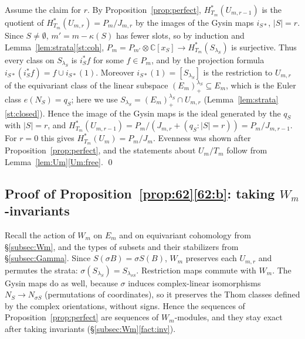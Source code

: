 \documentclass[11pt]{amsart}
\theoremstyle{definition}
\theoremstyle{remark}
\numberwithin{equation}{section}
\newcommand{\C}{\mathbb{C}}
\newcommand{\Lp}{(E_m)^{\lambda_S}_{+}}
\begin{document}
Assume the claim for $r$. By Proposition~\ref{prop:perfect}, $H^*_{T_m}(U_{m,r-1})$ is the quotient of
$H^*_{T_m}(U_{m,r})=P_m/J_{m,r}$ by the images of the Gysin maps $i_{S*}$, $|S|=r$. Since $S\neq\emptyset$,
$m'=m-\kappa(S)$ has fewer slots, so by induction and Lemma~\ref{lem:strata}\ref{st:coh},
$P_m=P_{m'}\otimes\C[x_S]\to H^*_{T_m}(S_{\lambda_S})$ is surjective. Thus every class on $S_{\lambda_S}$
is $i_S^*f$ for some $f\in P_m$, and by the projection formula $i_{S*}(i_S^*f)=f\cup i_{S*}(1)$. Moreover
$i_{S*}(1)=[S_{\lambda_S}]$ is the restriction to $U_{m,r}$ of the equivariant class of the linear
subspace $\Lp\subseteq E_m$, which is the Euler class $e(N_S)=q_S$; here we use
$S_{\lambda_S}=\Lp\cap U_{m,r}$ (Lemma~\ref{lem:strata}\ref{st:closed}). Hence the image of the Gysin maps
is the ideal generated by the $q_S$ with $|S|=r$, and
$H^*_{T_m}(U_{m,r-1})=P_m/(J_{m,r}+(q_S:|S|=r))=P_m/J_{m,r-1}$. For $r=0$ this gives
$H^*_{T_m}(U_m)=P_m/J_m$. Evenness was shown after Proposition~\ref{prop:perfect}, and the statements
about $U_m/T_m$ follow from Lemma~\ref{lem:Um}\ref{Um:free}. \qed

\subsection{Proof of Proposition~\ref{prop:62}\ref{62:b}: taking \texorpdfstring{$W_m$}{W\_m}-invariants}\label{subsec:proofb}
Recall the action of $W_m$ on $E_m$ and on equivariant cohomology from \S\ref{subsec:Wm}, and the types
of subsets and their stabilizers from \S\ref{subsec:Gamma}. Since $S(\sigma B)=\sigma S(B)$, $W_m$
preserves each $U_{m,r}$ and permutes the strata: $\sigma(S_{\lambda_S})=S_{\lambda_{\sigma S}}$.
Restriction maps commute with $W_m$. The Gysin maps do as well, because $\sigma$ induces complex-linear
isomorphisms $N_S\to N_{\sigma S}$ (permutations of coordinates), so it preserves the Thom classes defined
by the complex orientations, without signs. Hence the sequences of Proposition~\ref{prop:perfect} are
sequences of $W_m$-modules, and they stay exact after taking invariants (\S\ref{subsec:Wm}\ref{fact:inv}).
\end{document}
